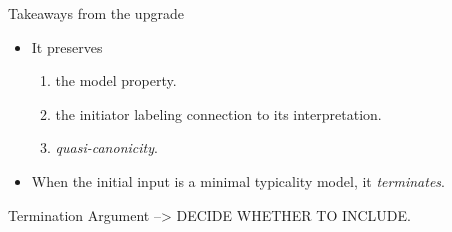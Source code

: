 \documentclass[10pt, xcolor=dvipsnames]{beamer}
\begin{document}
\begin{frame}{Takeaways from the upgrade}

  \large
  \begin{itemize}
    \item It preserves 
    \begin{enumerate}
      \item the model property. \pause
      \item the initiator labeling connection to its interpretation. \pause 
      \item \emph{quasi-canonicity}. \pause 
    \end{enumerate}
    \item When the initial input is a minimal typicality model, it \emph{terminates}.
  \end{itemize}

  
\end{frame}

\begin{frame}{Termination Argument}
 --> DECIDE WHETHER TO INCLUDE.
\end{frame}
\end{document}
